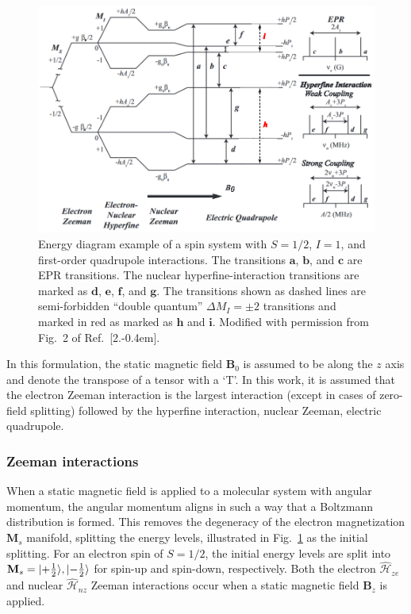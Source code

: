 \begin{figure}[ht]
 \centering
 \includegraphics[width=\textwidth]{Kapitel/Ch2-Images/EnergyDiagram.eps}
 \caption[Energy diagram example with S=1/2 and I=1.]{Energy diagram example of a spin system with $S=1/2$, $I=1$, and first-order quadrupole interactions. The transitions $\mathbf{a}$, $\mathbf{b}$, and $\mathbf{c}$ are EPR transitions. The nuclear hyperfine-interaction transitions are marked as $\mathbf{d}$, $\mathbf{e}$, $\mathbf{f}$, and $\mathbf{g}$. The transitions shown as dashed lines are semi-forbidden ``double quantum'' $\Delta M_I = \pm 2$ transitions and marked in red as marked as $\mathbf{h}$ and $\mathbf{i}$. Modified with permission from Fig.~2 of Ref.~[2.\kern-0.4em].}
 \label{fig:EPREnergy}
\end{figure}

In this formulation, the static magnetic field $\mathbf{B}_0$ is assumed to be along the $z$ axis and denote the transpose of a tensor with a `T'. In this work, it is assumed that the electron Zeeman interaction is the largest interaction (except in cases of zero-field splitting) followed by the hyperfine interaction, nuclear Zeeman, electric quadrupole.

\subsubsection*{Zeeman interactions}
When a static magnetic field is applied to a molecular system with angular momentum, the angular momentum aligns in such a way that a Boltzmann distribution is formed. This removes the degeneracy of the electron magnetization $\mathbf{M}_s$ manifold, splitting the energy levels, illustrated in Fig.~\ref{fig:EPREnergy} as the initial splitting. For an electron spin of $S = 1/2$, the initial energy levels are split into $\mathbf{M}_s = \lvert+\frac{1}{2}\rangle, \lvert-\frac{1}{2}\rangle$ for spin-up and spin-down, respectively. Both the electron $\hat{\mathcal{H}}_{ze}$ and nuclear $\hat{\mathcal{H}}_{nz}$ Zeeman interactions occur when a static magnetic field $\mathbf{B}_z$ is applied.

